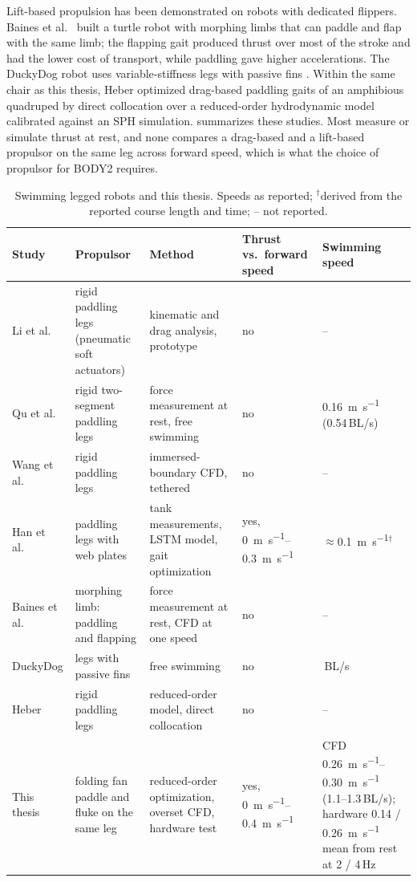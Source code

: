 Lift-based propulsion has been demonstrated on robots with dedicated flippers. Baines et al.\
\cite{Baines2022} built a turtle robot with morphing limbs that can paddle and flap with the same limb; the
flapping gait produced thrust over most of the stroke and had the lower cost of transport, while paddling
gave higher accelerations. The DuckyDog robot uses variable-stiffness legs with passive fins
\cite{Wang2025DuckyDog}. Within the same chair as this thesis, Heber \cite{Heber2026} optimized drag-based
paddling gaits of an amphibious quadruped by direct collocation over a reduced-order hydrodynamic model
calibrated against an SPH simulation. \Cref{tab:rw-robots} summarizes these studies. Most measure or simulate thrust at rest, and
none compares a drag-based and a lift-based propulsor on the same leg across forward speed, which is what the choice of propulsor
for BODY2 requires.

\begin{table}[htb]
  \centering
  \caption[Swimming legged robots]{Swimming legged robots and this thesis. Speeds as reported; $^\dagger$derived from the reported course
    length and time; -- not reported.}
  \label{tab:rw-robots}
  \footnotesize
  \begin{tabularx}{\textwidth}{@{}>{\raggedright\arraybackslash}p{30mm}>{\raggedright\arraybackslash}p{34mm}>{\raggedright\arraybackslash}p{30mm}>{\raggedright\arraybackslash}X>{\raggedright\arraybackslash}p{24mm}@{}}
    \toprule
    Study & Propulsor & Method & Thrust vs.\ forward speed & Swimming speed \\
    \midrule
    Li et al.\ \cite{Li2019} & rigid paddling legs (pneumatic soft actuators) & kinematic and drag analysis, prototype & no & -- \\
    Qu et al.\ \cite{Qu2025} & rigid two-segment paddling legs & force measurement at rest, free swimming & no & \SI{0.16}{\metre\per\second} (0.54\,BL/s) \\
    Wang et al.\ \cite{Wang2025} & rigid paddling legs & immersed-boundary CFD, tethered & no & -- \\
    Han et al.\ \cite{Han2025} & paddling legs with web plates & tank measurements, LSTM model, gait optimization & yes, \SIrange{0}{0.3}{\metre\per\second} & $\approx$\SI{0.1}{\metre\per\second}$^\dagger$ \\
    Baines et al.\ \cite{Baines2022} & morphing limb: paddling and flapping & force measurement at rest, CFD at one speed & no & -- \\
    DuckyDog \cite{Wang2025DuckyDog} & legs with passive fins & free swimming & no & 0.30\,BL/s \\
    Heber \cite{Heber2026} & rigid paddling legs & reduced-order model, direct collocation & no & -- \\
    \midrule
    This thesis & folding fan paddle and fluke on the same leg & reduced-order optimization, overset CFD, hardware test & yes, \SIrange{0}{0.4}{\metre\per\second} & CFD \SIrange{0.26}{0.30}{\metre\per\second} (1.1--1.3\,BL/s); hardware \SI{0.14}{} / \SI{0.26}{\metre\per\second} mean from rest at 2 / 4\,Hz \\
    \bottomrule
  \end{tabularx}
\end{table}


